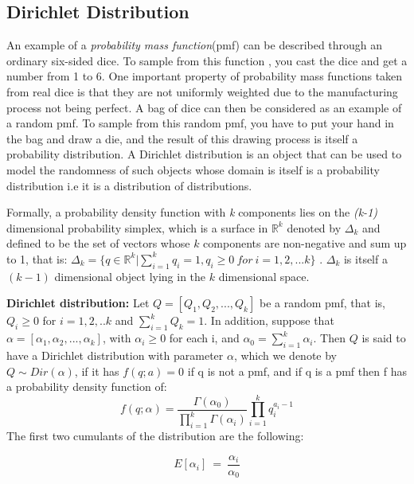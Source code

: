 \documentclass[twoside,hidelinks]{article}
\begin{document}
\subsection{Dirichlet Distribution}

An example of a \textit{probability mass function}(pmf) can be described through an ordinary six-sided dice. To sample from this function , you cast the dice and get a number from 1 to 6. One important property of probability mass functions taken from real dice is that they are not uniformly weighted due to the manufacturing process not being perfect. A bag of dice can then be considered as an example of a random pmf. To sample from this random pmf, you have to put your hand in the bag and draw a die, and the result of this drawing process is itself a probability distribution. A Dirichlet distribution is an object that can be used to model the randomness of such objects whose domain is itself is a probability distribution i.e it is a distribution of distributions.

Formally, a probability density function with \textit{k} components lies on the \textit{(k-1)} dimensional probability simplex, which is a surface in $ \mathbb{R}^k $ denoted by $ \Delta_k $ and defined to be the set of vectors whose $ k $  components are non-negative and sum up to 1, that is:  $ \Delta_k = \{ q \in  \mathbb{R}^k | \sum_{i=1}^k q_i=1, q_i \geq 0\ for\ i=1,2,...k \} $ . $ \Delta_k $  is itself a $ ( k-1 ) $ dimensional object lying in the $k$ dimensional space. 

\textbf{Dirichlet distribution:} Let $ Q = [Q_1,Q_2,...,Q_k  ] $ be a random pmf, that is, $ Q_i \geq 0 $ for $ i=1,2,..k $ and $ \sum_{i=1}^k Q_k=1 $. In addition, suppose that $ \alpha = [\alpha_1, \alpha_2, ..., \alpha_k ] $, with $ \alpha_i  \ge  0 $ for each i, and $ \alpha_0 = \sum_{i=1}^k \alpha_i $. Then $ Q $ is said to have a Dirichlet distribution with parameter $\alpha$, which we denote by $ Q \sim  Dir(\alpha)$, if it has $f(q;a) = 0$ if q is not a pmf, and if q is a pmf then f has a probability density function of:
\begin{equation}
 f(q; \alpha) = \frac{ \Gamma( \alpha_0)  }{ \prod_{i=1}^{k} \Gamma ( \alpha_i) } \prod_{i=1}^{k} q_i^{a_i -1}
\end{equation}
The first two cumulants of the distribution are the following:

\begin{equation}
 E[ \alpha_i]\ =\ \frac{ \alpha_i }{ \alpha_0 } 
\end{equation}
\end{document}
